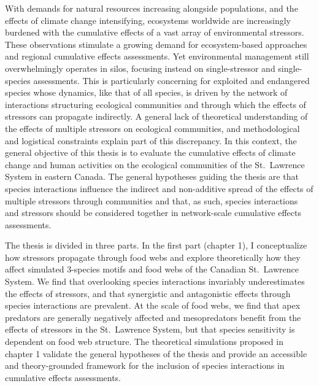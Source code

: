 With demands for natural resources increasing alongside populations, and
the effects of climate change intensifying, ecosystems worldwide are
increasingly burdened with the cumulative effects of a vast array of
environmental stressors. These observations stimulate a growing demand
for ecosystem-based approaches and regional cumulative effects
assessments. Yet environmental management still overwhelmingly operates
in silos, focusing instead on single-stressor and single-species
assessments. This is particularly concerning for exploited and
endangered species whose dynamics, like that of all species, is driven
by the network of interactions structuring ecological communities and
through which the effects of stressors can propagate indirectly. A
general lack of theoretical understanding of the effects of multiple
stressors on ecological communities, and methodological and logistical
constraints explain part of this discrepancy. In this context, the
general objective of this thesis is to evaluate the cumulative effects
of climate change and human activities on the ecological communities of
the St.~Lawrence System in eastern Canada. The general hypotheses
guiding the thesis are that species interactions influence the indirect
and non-additive spread of the effects of multiple stressors through
communities and that, as such, species interactions and stressors should
be considered together in network-scale cumulative effects assessments.

The thesis is divided in three parts. In the first part (chapter 1), I
conceptualize how stressors propagate through food webs and explore
theoretically how they affect simulated 3-species motifs and food webs
of the Canadian St.~Lawrence System. We find that overlooking species
interactions invariably underestimates the effects of stressors, and
that synergistic and antagonistic effects through species interactions
are prevalent. At the scale of food webs, we find that apex predators
are generally negatively affected and mesopredators benefit from the
effects of stressors in the St.~Lawrence System, but that species
sensitivity is dependent on food web structure. The theoretical
simulations proposed in chapter 1 validate the general hypotheses of the
thesis and provide an accessible and theory-grounded framework for the
inclusion of species interactions in cumulative effects assessments.

